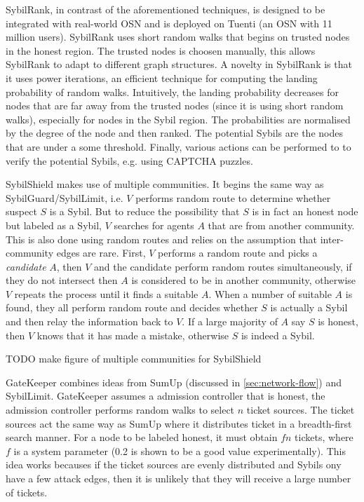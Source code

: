 
SybilRank, in contrast of the aforementioned techniques, is designed to be
integrated with real-world OSN and is deployed on Tuenti (an OSN with 11 million
users)\cite{cao2012aiding}. SybilRank uses short random walks that begins on
trusted nodes in the honest region. The trusted nodes is choosen manually, this
allows SybilRank to adapt to different graph structures. A novelty in SybilRank
is that it uses power iterations, an efficient technique for computing the
landing probability of random walks. Intuitively, the landing probability
decreases for nodes that are far away from the trusted nodes (since it is using
short random walks), especially for nodes in the Sybil region. The probabilities
are normalised by the degree of the node and then ranked. The potential Sybils
are the nodes that are under a some threshold. Finally, various actions can be
performed to to verify the potential Sybils, e.g. using CAPTCHA puzzles.

SybilShield\cite{shi2013sybilshield} makes use of multiple communities. It
begins the same way as SybilGuard/SybilLimit, i.e. $V$ performs random route to
determine whether suspect $S$ is a Sybil. But to reduce the possibility that $S$
is in fact an honest node but labeled as a Sybil, $V$ searches for agents $A$
that are from another community. This is also done using random routes and
relies on the assumption that inter-community edges are rare. First, $V$
performs a random route and picks a \emph{candidate} $A$, then $V$ and the
candidate perform random routes simultaneously, if they do not intersect then
$A$ is considered to be in another community, otherwise $V$ repeats the process
until it finds a suitable $A$. When a number of suitable $A$ is found, they all
perform random route and decides whether $S$ is actually a Sybil and then relay
the information back to $V$. If a large majority of $A$ say $S$ is honest, then
$V$ knows that it has made a mistake, otherwise $S$ is indeed a Sybil.

TODO make figure of multiple communities for SybilShield

GateKeeper\cite{tran2011optimal} combines ideas from SumUp (discussed in
\autoref{sec:network-flow}) and SybilLimit. GateKeeper assumes a admission
controller that is honest, the admission controller performs random walks to
select $n$ ticket sources. The ticket sources act the same way as SumUp where it
distributes ticket in a breadth-first search manner. For a node to be labeled
honest, it must obtain $fn$ tickets, where $f$ is a system parameter (0.2 is
shown to be a good value experimentally). This idea works becauses if the ticket
sources are evenly distributed and Sybils ony have a few attack edges, then it
is unlikely that they will receive a large number of tickets.

